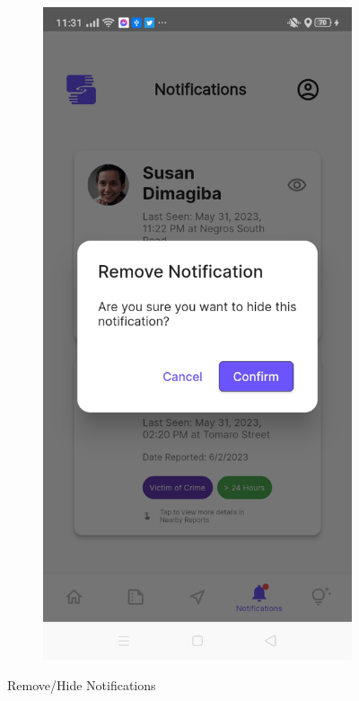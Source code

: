 \begin{figure}[!h]
\begin{subfigure}[c]{0.40\linewidth}
    \end{subfigure}
    \centering
    \begin{subfigure}[c]{0.40\linewidth}
        \centering
        \includegraphics[scale=0.15]{figures/Chapter4/Main/Notifications-3.jpg}
    \end{subfigure}
    \caption{Remove/Hide Notifications}
    \label{fig:removeNotification}
\end{figure}

